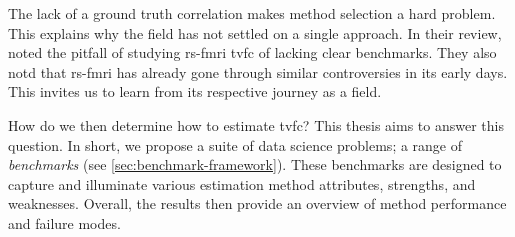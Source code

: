 The lack of a ground truth correlation makes method selection a hard problem.
This explains why the field has not settled on a single approach.
%
In their review, \textcite{Lurie2020} noted the pitfall of studying \gls{rs-fmri} \gls{tvfc} of lacking clear benchmarks.
They also notd that \gls{rs-fmri} has already gone through similar controversies in its early days.
This invites us to learn from its respective journey as a field.

How do we then determine how to estimate \gls{tvfc}?
This thesis aims to answer this question.
In short, we propose a suite of data science problems; a range of \emph{benchmarks} (see \cref{sec:benchmark-framework}).
These benchmarks are designed to capture and illuminate various estimation method attributes, strengths, and weaknesses.
Overall, the results then provide an overview of method performance and failure modes.
